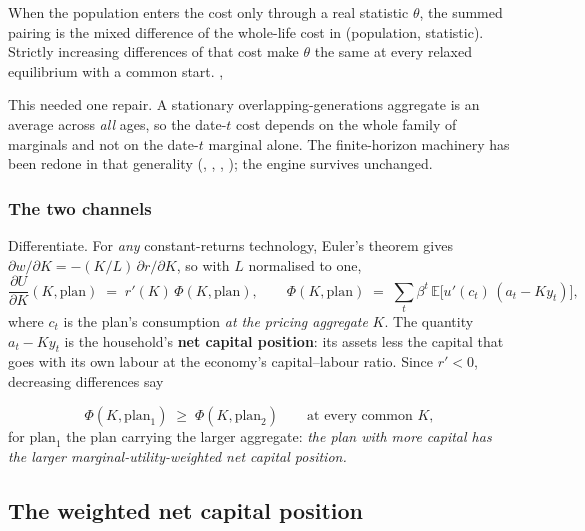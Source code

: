 \begin{theorem}\label{thm:mfgred}
When the population enters the cost only through a real statistic $\theta$, the summed pairing is
the mixed difference of the whole-life cost in (population, statistic). Strictly increasing
differences of that cost make $\theta$ the same at every relaxed equilibrium with a common start.
,
\end{theorem}

This needed one repair. A stationary overlapping-generations aggregate is an average across
\emph{all} ages, so the date-$t$ cost depends on the whole family of marginals and not on the
date-$t$ marginal alone. The finite-horizon machinery has been redone in that generality
(, , ,
); the engine survives unchanged.

\subsubsection*{The two channels}

Differentiate. For \emph{any} constant-returns technology, Euler's theorem gives
$\partial w/\partial K=-(K/L)\,\partial r/\partial K$, so with $L$ normalised to one,
\[
  \frac{\partial U}{\partial K}(K,\text{plan})\;=\;r'(K)\,\Phi(K,\text{plan}),
  \qquad
  \Phi(K,\text{plan})\;=\;\sum_t\beta^t\,\mathbb E\bigl[u'(c_t)\,(a_t-Ky_t)\bigr],
\]
where $c_t$ is the plan's consumption \emph{at the pricing aggregate} $K$. The quantity $a_t-Ky_t$
is the household's \textbf{net capital position}: its assets less the capital that goes with its own
labour at the economy's capital--labour ratio. Since $r'<0$, decreasing differences say

\begin{equation}\label{eq:W}
  \Phi(K,\text{plan}_1)\;\ge\;\Phi(K,\text{plan}_2)
  \qquad\text{at every common }K,
  \tag{W}
\end{equation}
for $\text{plan}_1$ the plan carrying the larger aggregate: \emph{the plan with more capital has the
larger marginal-utility-weighted net capital position.}

\subsection{The weighted net capital position}

